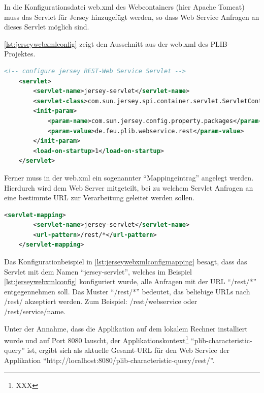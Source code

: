 In die Konfigurationsdatei web.xml des Webcontainers (hier \gls{Apache Tomcat}) muss das Servlet für \gls{Jersey} hinzugefügt werden, so dass \gls{Web Service} Anfragen an dieses Servlet möglich sind. 

\autoref{lst:jerseywebxmlconfig} zeigt den Ausschnitt aus der web.xml des \gls{PLIB}-Projektes. 

 \begin{lstlisting}[caption=Jersey Servlet Konfiguration in web.xml, language=XML, label=lst:jerseywebxmlconfig]
 <!-- configure jersey REST-Web Service Servlet -->
    <servlet>
        <servlet-name>jersey-servlet</servlet-name>
        <servlet-class>com.sun.jersey.spi.container.servlet.ServletContainer</servlet-class>
        <init-param>
            <param-name>com.sun.jersey.config.property.packages</param-name>
            <param-value>de.feu.plib.webservice.rest</param-value>
        </init-param>
        <load-on-startup>1</load-on-startup>
    </servlet>
 \end{lstlisting}   
 
Ferner muss in der web.xml ein sogenannter \enquote{Mappingeintrag} angelegt werden. Hierdurch wird dem Web Server mitgeteilt, bei zu welchem Servlet Anfragen an eine bestimmte URL zur Verarbeitung geleitet werden sollen. 
 
  \begin{lstlisting}[caption=Jersey Servlet Mappingkonfiguration in web.xml, language=XML, label=lst:jerseywebxmlconfigmapping]
    <servlet-mapping>
        <servlet-name>jersey-servlet</servlet-name>
        <url-pattern>/rest/*</url-pattern>
    </servlet-mapping>
 \end{lstlisting}  
 
Das Konfigurationbeispiel in \autoref{lst:jerseywebxmlconfigmapping}  besagt, dass das Servlet mit dem Namen \enquote{jersey-servlet}, welches im Beispiel \autoref{lst:jerseywebxmlconfig}  konfiguriert wurde, alle Anfragen mit der URL \enquote{/rest/*} entgegennehmen soll. Das Muster \enquote{/rest/*} bedeutet, das beliebige URLs nach /rest/ akzeptiert werden. Zum Beispiel: /rest/webservice oder /rest/service/name.

Unter der Annahme, dass die Applikation auf dem lokalem Rechner installiert wurde und auf Port 8080 lauscht, der Applikationskontext\footnote{XXX} \enquote{plib-characteristic-query} ist, ergibt sich als aktuelle Gesamt-URL für den Web Service der Applikation \enquote{http://localhost:8080/plib-characteristic-query/rest/}.
 

